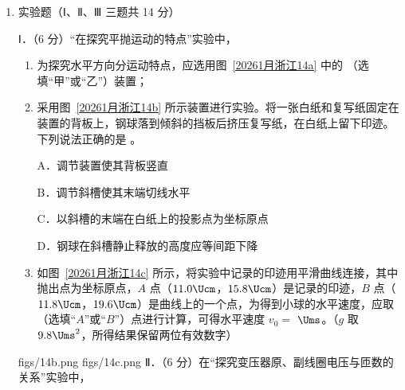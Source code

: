 \documentclass[\gkver]{gaokaozhenti}
\begin{document}
\begin{enumerate}
{可得 $\gamma$ 光子的动量大小为 $p_{\gamma}=eB(r_{1}+r_{2}+r_{3})$，B 正确；

C．正负电子在磁场运动时受阻力作用速度逐渐减小，则做圆周运动的半径逐渐减小，即电子做螺旋运动，将电子的轨迹分成无数小段，每一小段均可看做是一段圆弧，因速度方向总是沿对应的一小段圆弧的切线方向，电子在每一小段上做圆周运动的圆心是固定的（该位置为电子刚开始做圆周运动时的圆心位置，对沿 2、3 轨迹的电子分别为 $P$ 点和 $Q$ 点），电子最终停止运动时将停止在该圆心位置，可知 $O$ 与 $P$、$Q$ 的距离之比 $OP:OQ = r_{2}:r_{3}$，C 正确；

D．沿径迹 1 运动的电子初速度为 $v_{1} = \frac{eBr_{1}}{m}$

电子受的阻力 $f = kv$

由动量定理 $-kv\Delta t = 0 - m\Delta v$

求和可得 $\sum kv\Delta t = \sum m\Delta v$

即 $ks = mv_{1}$

总路程为 $s = \frac{eB}{k}r_{1}$，D 错误。

故选 BC。
}

\item
实验题（Ⅰ、Ⅱ、Ⅲ 三题共 14 分）

Ⅰ．（6 分）“在探究平抛运动的特点”实验中，

\begin{enumerate}
	\item
	为探究水平方向分运动特点，应选用图~\ref{20261月浙江14a} 中的  （选填“甲”或“乙”）装置；
	\item
	采用图~\ref{20261月浙江14b} 所示装置进行实验。将一张白纸和复写纸固定在装置的背板上，钢球落到倾斜的挡板后挤压复写纸，在白纸上留下印迹。下列说法正确的是  。

	A．调节装置使其背板竖直

	B．调节斜槽使其末端切线水平

	C．以斜槽的末端在白纸上的投影点为坐标原点

	D．钢球在斜槽静止释放的高度应等间距下降

	\item
	如图~\ref{20261月浙江14c} 所示，将实验中记录的印迹用平滑曲线连接，其中抛出点为坐标原点，$A$ 点（$11.0\Ucm$，$15.8\Ucm$）是记录的印迹，$B$ 点（$11.8\Ucm$，$19.6\Ucm$）是曲线上的一个点，为得到小球的水平速度，应取  （选填“$A$”或“$B$”）点进行计算，可得水平速度 $v_{0}=$  $\Ums$。（$g$ 取 $9.8\Ums^{2}$，所得结果保留两位有效数字）
\end{enumerate}
{figs/14b.png}
{figs/14c.png}
Ⅱ．（6 分）在“探究变压器原、副线圈电压与匝数的关系”实验中，


\end{enumerate}
\end{document}
